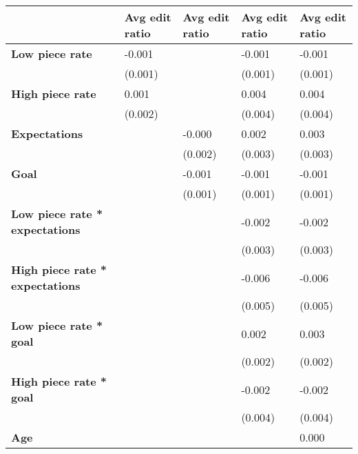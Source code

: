 \begin{tabular}{lllll}
\toprule
{} & Avg edit ratio & Avg edit ratio & Avg edit ratio & Avg edit ratio \\
\midrule
\textbf{Low piece rate                } &         -0.001 &                &         -0.001 &         -0.001 \\
                               &        (0.001) &                &        (0.001) &        (0.001) \\
\textbf{High piece rate               } &          0.001 &                &          0.004 &          0.004 \\
                               &        (0.002) &                &        (0.004) &        (0.004) \\
\textbf{Expectations                  } &                &         -0.000 &          0.002 &          0.003 \\
                               &                &        (0.002) &        (0.003) &        (0.003) \\
\textbf{Goal                          } &                &         -0.001 &         -0.001 &         -0.001 \\
                               &                &        (0.001) &        (0.001) &        (0.001) \\
\textbf{Low piece rate * expectations } &                &                &         -0.002 &         -0.002 \\
                               &                &                &        (0.003) &        (0.003) \\
\textbf{High piece rate * expectations} &                &                &         -0.006 &         -0.006 \\
                               &                &                &        (0.005) &        (0.005) \\
\textbf{Low piece rate * goal         } &                &                &          0.002 &          0.003 \\
                               &                &                &        (0.002) &        (0.002) \\
\textbf{High piece rate * goal        } &                &                &         -0.002 &         -0.002 \\
                               &                &                &        (0.004) &        (0.004) \\
\textbf{Age                           } &                &                &                &          0.000 \\

\end{tabular}
